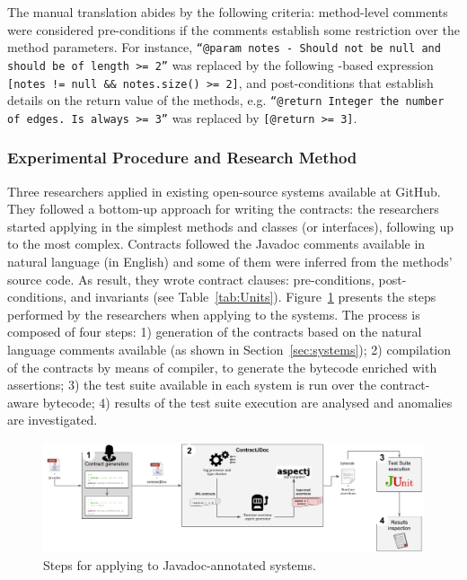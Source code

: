 The manual translation abides by the following criteria: method-level comments were considered pre-conditions
if the comments establish some restriction over the method parameters.
For instance, \texttt{``@param notes - Should not be null and should be of length >= 2''} was
replaced by the following \contractjdoc{}-based expression \texttt{[notes != null \&\& notes.size() >= 2]}, and
post-conditions that establish details on the return value of the
methods, e.g. \texttt{``@return Integer the number of edges. Is always >= 3''}
was replaced by \texttt{[@return >= 3]}. 

\subsubsection{Experimental Procedure and Research Method} 

Three researchers applied \contractjdoc{} in \totalSystems{} existing open-source systems
available at GitHub. They followed a bottom-up approach for
writing the \contractjdoc{} contracts: the researchers started applying
\contractjdoc{} in the simplest methods and classes (or interfaces), following
up to the most complex. Contracts followed the Javadoc comments available in
natural language (in English) and some of them were inferred from the methods'
source code.
As result, they wrote \totalClauses{} contract clauses:
\totalPre{} pre-conditions, \totalPost{} post-conditions, and \totalInv{} invariants (see
Table~\ref{tab:Units}).
Figure~\ref{fig:applicationProcess} presents the steps performed by the researchers when applying
\contractjdoc{} to the systems. The process is composed of four steps: 1) generation of the
contracts based on the natural language comments available (as shown in
Section~\ref{sec:systems}); 2) compilation of the contracts by means of
\contractjdocCompiler{} compiler, to generate the bytecode enriched with assertions; 3) the test suite available in each system is run over the contract-aware bytecode; 4) results of the test suite execution are analysed and
anomalies are investigated.

\begin{figure}[h]
\centering
\includegraphics[width=1.0\textwidth]{figs/ContractJDocProcess}
\caption{Steps for applying \contractjdoc{} to Javadoc-annotated systems.}
\label{fig:applicationProcess}
\end{figure}

